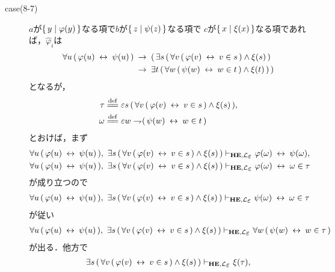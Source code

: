 \begin{metaprf}
\begin{description}
\begin{description}
					\item[case(8-7)] $a$が$\{\, y \mid \varphi(y)\, \}$なる項で$b$が$\{\, z \mid \psi(z)\, \}$なる項で
						$c$が$\{\, x \mid \xi(x)\, \}$なる項であれば，$\widehat{\varphi}_{i}$は
						\begin{align}
							\forall u\, (\, \varphi(u) \hspace{0.25em}\leftrightarrow\hspace{0.25em} \psi(u)\, ) 
							&\hspace{0.25em}\rightarrow\hspace{0.25em} (\, \exists s\, (\, \forall v\, (\, \varphi(v) \hspace{0.25em}\leftrightarrow\hspace{0.25em} v \in s\, ) \wedge \xi(s)\, ) \\
							&\hspace{0.25em}\rightarrow\hspace{0.25em} \exists t\, (\, \forall w\, (\, \psi(w) \hspace{0.25em}\leftrightarrow\hspace{0.25em} w \in t\, ) \wedge \xi(t)\, )\, )
						\end{align}
						となるが，
						\begin{align}
							\tau &\defeq \varepsilon s\, (\, \forall v\, (\, \varphi(v) \lrarrow v \in s\, ) \wedge \xi(s)\, ), \\
							\omega &\defeq \varepsilon w \negation (\, \psi(w) \lrarrow w \in t\, )
						\end{align}
						とおけば，まず
						\begin{align}
							\forall u\, (\, \varphi(u) \lrarrow \psi(u)\, ),\ 
							\exists s\, (\, \forall v\, (\, \varphi(v) \lrarrow v \in s\, ) \wedge \xi(s)\, )
							&\provable{\mbox{{\bf HE}},\lang{\varepsilon}} \varphi(\omega) \lrarrow \psi(\omega), \\
							\forall u\, (\, \varphi(u) \lrarrow \psi(u)\, ),\ 
							\exists s\, (\, \forall v\, (\, \varphi(v) \lrarrow v \in s\, ) \wedge \xi(s)\, )
							&\provable{\mbox{{\bf HE}},\lang{\varepsilon}} \varphi(\omega) \lrarrow \omega \in \tau
						\end{align}
						が成り立つので
						\begin{align}
							\forall u\, (\, \varphi(u) \lrarrow \psi(u)\, ),\ 
							\exists s\, (\, \forall v\, (\, \varphi(v) \lrarrow v \in s\, ) \wedge \xi(s)\, )
							\provable{\mbox{{\bf HE}},\lang{\varepsilon}} \psi(\omega) \lrarrow \omega \in \tau
						\end{align}
						が従い
						\begin{align}
							\forall u\, (\, \varphi(u) \lrarrow \psi(u)\, ),\ 
							\exists s\, (\, \forall v\, (\, \varphi(v) \lrarrow v \in s\, ) \wedge \xi(s)\, )
							\provable{\mbox{{\bf HE}},\lang{\varepsilon}} \forall w\, (\, \psi(w) \lrarrow w \in \tau\, )
						\end{align}
						が出る．他方で
						\begin{align}
							\exists s\, (\, \forall v\, (\, \varphi(v) \lrarrow v \in s\, ) \wedge \xi(s)\, )
							\provable{\mbox{{\bf HE}},\lang{\varepsilon}} \xi(\tau), \\

\end{align}
\end{description}
\end{description}
\end{metaprf}

